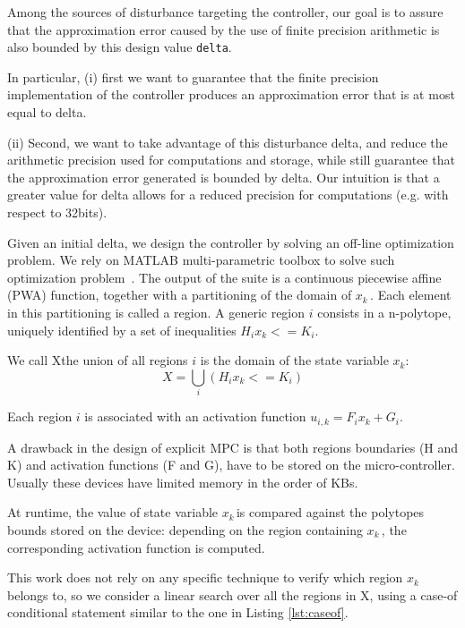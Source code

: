 \documentclass[sigconf]{acmart}
\newcommand{\statevar}{x_{k}}
\newcommand{\statevarmath}{$x_{k}\,$}
\newcommand{\statespace}{X}
\begin{document}
Among the sources of disturbance targeting the controller, our goal is to assure that the approximation error caused by the use of finite precision arithmetic is also bounded by this design value \texttt{delta}.

In particular, (i) first we want to guarantee that the finite precision implementation of the controller produces an approximation error that is at most equal to delta.

(ii) Second, we want to take advantage of this disturbance delta, and reduce the arithmetic precision used for computations and storage, while still guarantee that the approximation error generated is bounded by delta. Our intuition is that a greater value for delta allows for a reduced precision for computations (e.g. with respect to 32bits).

Given an initial delta, we design the controller by solving an off-line optimization problem. We rely on MATLAB multi-parametric toolbox to solve such optimization problem~\cite{matlabMPT, matlabYALMIP}. 
The output of the suite is a continuous piecewise affine (PWA) function, together with a partitioning of the domain of \statevarmath. Each element in this partitioning is called a region.
A generic region $i$ consists in a n-polytope, uniquely identified by a set of inequalities $H_{i}\statevar<=K_{i}$. 

We call \statespace\space the union of all regions $i$ is the domain of the state variable $x_{k}$:
\begin{equation}
\statespace = \bigcup_{i}(H_{i}\statevar<=K_{i})
\end{equation}

Each region $i$ is associated with an activation function $u_{i,k}=F_{i}x_{k}+G_{i}$.


A drawback in the design of explicit MPC is that both regions boundaries (H and K) and activation functions (F and G), have to be stored on the micro-controller. Usually these devices have limited memory in the order of KBs.

At runtime, the value of state variable \statevarmath  is compared against the polytopes bounds stored on the device: depending on the region containing \statevarmath, the corresponding activation function is computed.

This work does not rely on any specific technique to verify which region \statevarmath belongs to, so we consider a linear search over all the regions in \statespace\space, using a case-of conditional statement similar to the one in Listing \ref{lst:caseof}.
\end{document}
